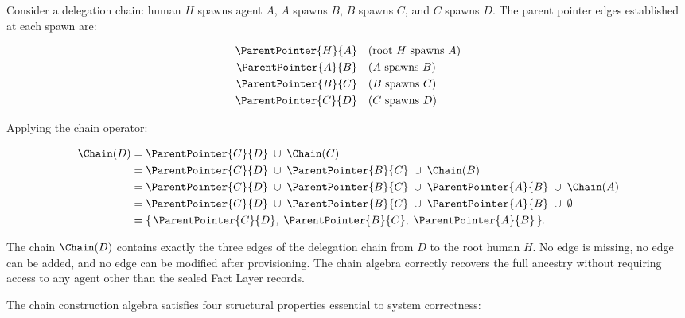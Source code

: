 \begin{examp}
Consider a delegation chain: human $H$ spawns agent $A$, $A$ spawns $B$, $B$ spawns $C$, and $C$ spawns $D$. The parent pointer edges established at each spawn are:

\begin{align*}
\ParentPointer{H}{A} &\quad \text{(root $H$ spawns $A$)} \\
\ParentPointer{A}{B} &\quad \text{($A$ spawns $B$)} \\
\ParentPointer{B}{C} &\quad \text{($B$ spawns $C$)} \\
\ParentPointer{C}{D} &\quad \text{($C$ spawns $D$)}
\end{align*}

Applying the chain operator:

\begin{align*}
\Chain(D) &= \ParentPointer{C}{D} \; \cup\; \Chain(C) \\
         &= \ParentPointer{C}{D} \; \cup\; \ParentPointer{B}{C} \; \cup\; \Chain(B) \\
         &= \ParentPointer{C}{D} \; \cup\; \ParentPointer{B}{C} \; \cup\; \ParentPointer{A}{B} \; \cup\; \Chain(A) \\
         &= \ParentPointer{C}{D} \; \cup\; \ParentPointer{B}{C} \; \cup\; \ParentPointer{A}{B} \; \cup\; \emptyset \\
         &= \{\, \ParentPointer{C}{D},\; \ParentPointer{B}{C},\; \ParentPointer{A}{B} \,\}.
\end{align*}

The chain $\Chain(D)$ contains exactly the three edges of the delegation chain from $D$ to the root human $H$. No edge is missing, no edge can be added, and no edge can be modified after provisioning. The chain algebra correctly recovers the full ancestry without requiring access to any agent other than the sealed Fact Layer records.
\end{examp}

The chain construction algebra satisfies four structural properties essential to system correctness:

